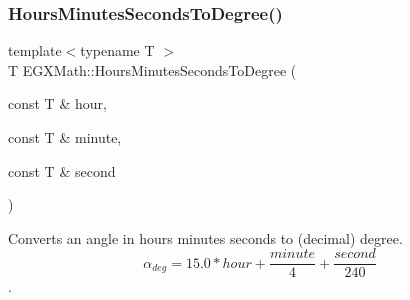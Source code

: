 \subsubsection{\texorpdfstring{Hours\+Minutes\+Seconds\+To\+Degree()}{HoursMinutesSecondsToDegree()}}
{\footnotesize\ttfamily template$<$typename T $>$ \\
T E\+G\+X\+Math\+::\+Hours\+Minutes\+Seconds\+To\+Degree (\begin{DoxyParamCaption}\item[{const T \&}]{hour,  }\item[{const T \&}]{minute,  }\item[{const T \&}]{second }\end{DoxyParamCaption})}



Converts an angle in hours minutes seconds to (decimal) degree. \[\alpha_{deg}=15.0 * hour + \frac{minute}{4} + \frac{second}{240}\]. 

